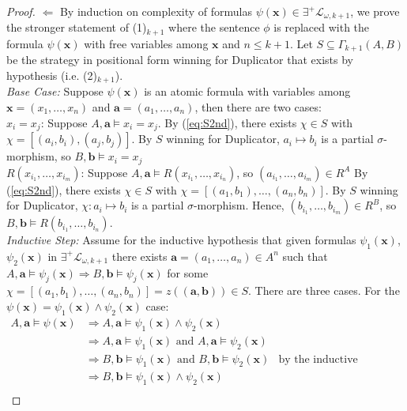 \begin{prop}
\begin{proof}
$\Leftarrow$ By induction on complexity of formulas $\psi(\mathbf{x}) \in \exists^{+}\mathcal{L}_{\omega,k+1}$, we prove the stronger statement of (1)$_{k+1}$ where the sentence $\phi$ is replaced with the formula $\psi(\mathbf{x})$ with free variables among $\mathbf{x}$ and $n \leq k+1$. Let $S \subseteq \Gamma_{k+1}(A,B)$ be the strategy in positional form winning for Duplicator that exists by hypothesis (i.e. (2)$_{k+1}$). \\
\textit{Base Case:} Suppose $\psi(\mathbf{x})$ is an atomic formula with variables among $\mathbf{x} = (x_{1},\dots,x_{n})$ and $\mathbf{a} = (a_{1},\dots,a_{n})$, then there are two cases: \\
$x_{i} = x_{j}$: Suppose $A,\mathbf{a} \vDash x_{i} = x_{j}$. By (\ref{eq:S2nd}), there exists $\chi \in S$ with $\chi = [(a_{i},b_{i}),(a_{j},b_{j})]$. By $S$ winning for Duplicator, $a_{i} \mapsto b_{i}$ is a partial $\sigma$-morphism, so $B,\mathbf{b} \vDash x_{i} = x_{j}$\\
$R(x_{i_{1}},\dots,x_{i_{m}})$: Suppose $A,\mathbf{a} \vDash R(x_{i_{1}},\dots,x_{i_{n}})$, so $(a_{i_{1}},\dots,a_{i_{m}}) \in R^{A}$ By (\ref{eq:S2nd}), there exists $\chi \in S$ with $\chi = [(a_{1},b_{1}),\dots,(a_{n},b_{n})]$. By $S$ winning for Duplicator, $\chi:a_{i} \mapsto b_{i}$ is a partial $\sigma$-morphism. Hence, $(b_{i_{1}},\dots,b_{i_{m}}) \in R^{B}$, so $B,\mathbf{b} \vDash R(b_{i_{1}},\dots,b_{i_{n}})$. \\
\textit{Inductive Step:} Assume for the inductive hypothesis that given formulas $\psi_{1}(\mathbf{x})$, $\psi_{2}(\mathbf{x})$ in $\exists^{+}\mathcal{L}_{\omega,k+1}$ there exists $\mathbf{a} = (a_{1},\dots,a_{n}) \in A^{n}$ such that $A,\mathbf{a} \vDash \psi_{j}(\mathbf{x}) \Rightarrow B,\mathbf{b} \vDash \psi_{j}(\mathbf{x})$ for some $\chi = [(a_{1},b_{1}),\dots,(a_{n},b_{n})] = z((\mathbf{a},\mathbf{b})) \in S$. There are three cases. For the $\psi(\mathbf{x}) = \psi_{1}(\mathbf{x}) \wedge \psi_{2}(\mathbf{x})$ case: 
\begin{align*}
A,\mathbf{a} \vDash \psi(\mathbf{x}) &\Rightarrow A,\mathbf{a} \vDash \psi_{1}(\mathbf{x}) \wedge \psi_{2}(\mathbf{x}) \\
&\Rightarrow A,\mathbf{a} \vDash \psi_{1}(\mathbf{x}) \text{ and } A,\mathbf{a} \vDash \psi_{2}(\mathbf{x}) \\
&\Rightarrow B,\mathbf{b} \vDash \psi_{1}(\mathbf{x}) \text{ and } B,\mathbf{b} \vDash \psi_{2}(\mathbf{x}) & \text{by the inductive hypothesis}\\
&\Rightarrow B,\mathbf{b} \vDash \psi_{1}(\mathbf{x}) \wedge \psi_{2}(\mathbf{x}) \\

\end{align*}
\end{proof}
\end{prop}
